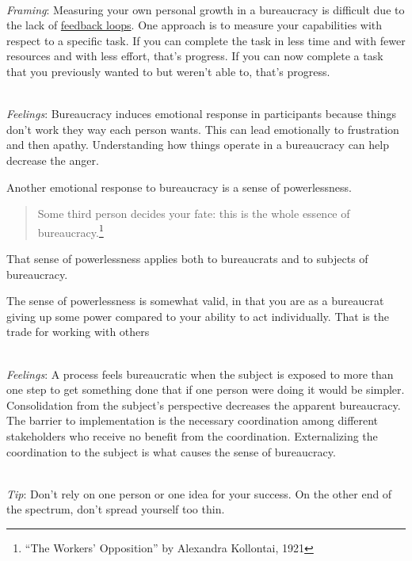 \ \\
\textit{Framing}: Measuring your own personal growth in a bureaucracy is difficult due to the lack of \hyperref[sec:feedback-loop-and-ripples]{feedback loops}. One approach is to measure your capabilities with respect to a specific task. If you can complete the task in less time and with fewer resources and with less effort, that's progress. If you can now complete a task that you previously wanted to but weren't able to, that's progress.


\ \\
\textit{Feelings}: Bureaucracy induces emotional response in participants because things don't work they way each person wants. This can lead emotionally to frustration and then apathy. Understanding how things operate in a bureaucracy can help decrease the anger.


Another emotional response to bureaucracy is a sense of powerlessness. 
\begin{quote}
Some third person decides your fate: this is the whole essence of bureaucracy.\footnote{``The Workers' Opposition'' by Alexandra Kollontai, 1921}
\end{quote}
That sense of powerlessness applies both to bureaucrats and to subjects of bureaucracy. 

The sense of powerlessness is somewhat valid, in that you are as a bureaucrat giving up some power compared to your ability to act individually. That is the trade for working with others

\ \\
\textit{Feelings}: A process feels bureaucratic when the subject is exposed to more than one step to get something done that if one person were doing it would be simpler. Consolidation from the subject's perspective decreases the apparent bureaucracy. The barrier to implementation is the necessary coordination among different stakeholders who receive no benefit from the coordination. Externalizing the coordination to the subject is what causes the sense of bureaucracy. 


\ \\
\textit{Tip}: Don't rely on one person or one idea for your success. On the other end of the spectrum, don't spread yourself too thin. 

